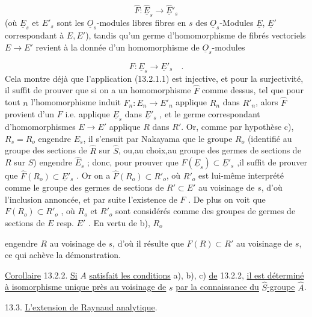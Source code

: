 \begin{equation*}
\hat{F} : \hat{\underline{E}}_s \longrightarrow \hat{\underline{E}}'_s
\end{equation*}
(où $\underline{E}_s$ et $E'_s$ sont les $\underline{O}_s$-modules libres fibres en $s$ des $\underline{O}_s$-Modules $\underline{E}$, $\underline{E}'$ correspondant à $E,E'$), tandis qu'un germe d'homomorphisme de fibrés vectoriels $E \longrightarrow E'$ revient à la donnée d'un homomorphisme de $\underline{O}_s$-modules

\begin{equation*}
F : \underline{E}_s \longrightarrow \underline{E}'_s \quad .
\end{equation*}
Cela montre déjà que l'application (13.2.1.1) est injective, et pour la surjectivité, il suffit de prouver que si on a un homomorphisme $\hat{F}$ comme dessus, tel que pour tout $n$ l'homomorphisme induit $F_n : E_n \longrightarrow E'_n$ applique $R_n$ dans $R'_n$, alors $\hat{F}$ provient d'un $F$ i.e. applique $\underline{E}_s$ dans $\underline{E}'_s$ , et le germe correspondant d'homomorphismes $E \longrightarrow E'$ applique $R$ dans $R'$. Or, comme par hypothèse c), $R_s = R_o$ engendre $E_s$, il s'ensuit par Nakayama que le groupe $R_o$ (identifié au groupe des sections de $\hat{R}$ sur $\hat{S}$, ou,au choix,au groupe des germes de sections de $R$ sur $S$) engendre $\hat{E}_s$ ; donc, pour prouver que $\hat{F}(\underline{E}_s) \subset \underline{E}'_s$ ,il suffit de prouver que $\hat{F}(R_o) \subset \underline{E}'_s$ . Or on a $\hat{F}(R_o) \subset R'_o$, où $R'_o$ est lui-même interprété comme le groupe des germes de sections de $R' \subset E'$ au voisinage de $s$, d'où l'inclusion annoncée, et par suite l'existence de $F$ . De plus on voit que $F(R_o) \subset R'_o$ , où $R_o$ et $R'_o$ sont considérés comme des groupes de germes de sections de $E$ resp. $E'$ . En vertu de b), $R_o$



engendre $R$ au voisinage de $s$, d'où il résulte que $F(R) \subset R'$ au voisinage de $s$, ce qui achève la démonstration.

\underline{Corollaire} 13.2.2. \underline{Si} $A$ \underline{satisfait les conditions} a), b), c) \underline{de} 13.2.2, \underline{il est déterminé à isomorphisme unique près au voisinage de} $s$ \underline{par la connaissance du} $\hat{S}$\underline{-groupe} $\hat{A}$.


13.3. \underline{L'extension de Raynaud analytique}.

